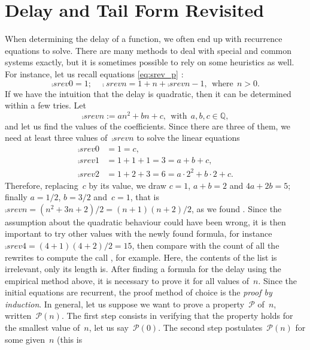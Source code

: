 
\chapter{Delay and Tail Form Revisited}

When determining the delay of a function, we often end up with
recurrence equations to solve. There are many methods to deal with
special and common systems exactly, but it is sometimes possible to
rely on some heuristics as well. For instance, let us recall equations
\eqref{eq:srev_p} :
\begin{equation}
\comp{srev}{0} = 1;\quad
\comp{srev}{n} = 1 + n + \comp{srev}{n-1},\,\;
\text{where}\;\, n > 0.\label{eq:srev_n}
\end{equation}
If we have the intuition that the delay is quadratic, then it can be
determined within a few tries. Let
\[
\comp{srev}{n} := a n^2 + b n + c,\,\; \text{with} \,\; a, b,
c \in \mathbb{Q},
\]
and let us find the values of the coefficients. Since there are three
of them, we need at least three values of~\(\comp{srev}{n}\) to solve
the linear equations
\begin{align*}
\comp{srev}{0} &= 1 = c,\\
\comp{srev}{1} &= 1 + 1 + 1 = 3 = a + b + c,\\
\comp{srev}{2} &= 1 + 2 + 3 = 6 = a \cdot 2^2 + b \cdot 2 + c.
\end{align*}
Therefore, replacing~\(c\) by its value, we draw \(c = 1\), \(a + b =
2\) and \(4a + 2b = 5\); finally \(a = 1/2\), \(b = 3/2\) and~\(c =
1\), that is \(\comp{srev}{n} = (n^2 + 3n + 2)/2 = (n+1)(n+2)/2\), as
we found . Since the assumption about the
quadratic behaviour could have been wrong, it is then important to try
other values with the newly found formula, for instance
\(\comp{srev}{4} = (4+1)(4+2)/2 = 15\), then compare with the count of
all the rewrites to compute the call , for
example. Here, the contents of the list is irrelevant, only its length
is. After finding a formula for the delay using the empirical method
above, it is necessary to prove it for all values of~\(n\). Since the
initial equations are recurrent, the proof method of choice is the
\emph{proof by induction}. In general, let us suppose we want to prove
a property~\(\mathcal{P}\) of~\(n\), written~\(\mathcal{P}(n)\). The
first step consists in verifying that the property holds for the
smallest value of~\(n\), let us say~\(\mathcal{P}(0)\). The second
step postulates~\(\mathcal{P}(n)\) for some given~\(n\) (this is

